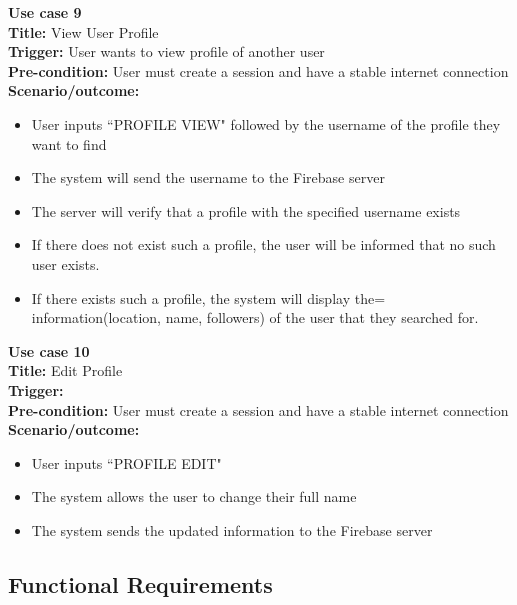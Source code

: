 \documentclass[12pt, titlepage]{article}
\begin{document}
    
\textbf{Use case 9}\\
\textbf{Title:} View User Profile\\
\textbf{Trigger:} User wants to view profile of another user\\
\textbf{Pre-condition:} User must create a session and have a stable internet connection\\
\textbf{Scenario/outcome:}
    \begin{itemize}
        \item User inputs ``PROFILE VIEW" followed by the username of the profile they want to find
        \item The system will send the username to the Firebase server
        \item The server will verify that a profile with the specified username exists
        \item If there does not exist such a profile, the user will be informed that no such user exists.
        \item If there exists such a profile, the system will display the= information(location, name, followers) of the user that they searched for.
    \end{itemize}
    
\textbf{Use case 10}\\
\textbf{Title:} Edit Profile\\
\textbf{Trigger:}\\
\textbf{Pre-condition:} User must create a session and have a stable internet connection\\
\textbf{Scenario/outcome:}
    \begin{itemize}
        \item User inputs ``PROFILE EDIT"
        \item The system allows the user to change their full name
        \item The system sends the updated information to the Firebase server 
    \end{itemize}

\subsection{Functional Requirements}
\end{document}

